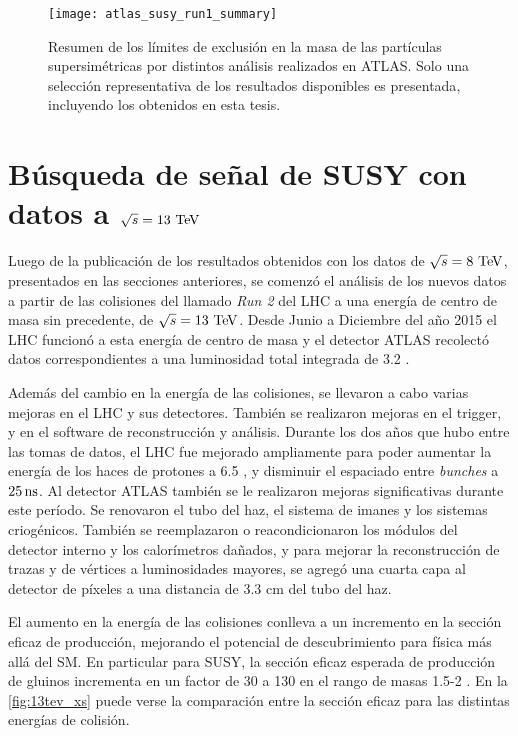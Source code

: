 \begin{figure}[!htb]
  \centering

  \texttt{[image: atlas\_susy\_run1\_summary]}

  \caption{Resumen de los límites de exclusión en la masa de las partículas
    supersimétricas por distintos análisis realizados en ATLAS. Solo una
    selección representativa de los resultados disponibles es
    presentada\cite{susy_summary}, incluyendo los obtenidos en esta tesis.}
  \label{fig:susy_summary}

\end{figure}



\section{Búsqueda de señal de SUSY con datos a $\sqrt{s} = 13 \tev$}
\label{sec:results13tev}

Luego de la publicación de los resultados obtenidos con los datos de
$\sqrt{s}=8\tev$, presentados en las secciones anteriores, se comenzó el
análisis de los nuevos datos a partir de las colisiones del llamado \emph{Run
  2} del LHC a una energía de centro de masa sin
precedente, de $\sqrt{s} = 13 \tev$. Desde Junio a Diciembre del a\~no 2015 el LHC funcionó a
esta energía de centro de masa y el detector ATLAS recolectó datos
correspondientes a una luminosidad total integrada de 3.2 \ifb.

Además del cambio en la energía de las colisiones, se llevaron a cabo varias
mejoras en el LHC y sus detectores. También se realizaron mejoras en el trigger, y en el
software de reconstrucción y análisis.
Durante los dos a\~nos que hubo entre las tomas de datos, el LHC fue mejorado
ampliamente para poder aumentar la energía de los haces de protones a 6.5
\tev, y disminuir el espaciado entre \emph{bunches} a $\unit[25]{ns}$.
Al detector ATLAS también se le realizaron mejoras significativas durante este período.
Se renovaron el tubo del haz, el sistema de imanes y los sistemas criogénicos. También se
reemplazaron o reacondicionaron los módulos del detector interno y los
calorímetros dañados, y para mejorar la reconstrucción de trazas y de vértices a
luminosidades mayores, se agregó una cuarta capa al detector de píxeles a una
distancia de 3.3 cm del tubo del haz.

El aumento en la energía de las colisiones conlleva a un incremento en la
sección eficaz de producción, mejorando el potencial de descubrimiento para
física más allá del SM. En particular para SUSY, la sección eficaz esperada de
producción de gluinos incrementa en un factor de 30 a 130 en el rango de masas
1.5-2 {\tev}. En la \cref{fig:13tev_xs} puede verse la comparación entre la
sección eficaz para las distintas energías de colisión.

